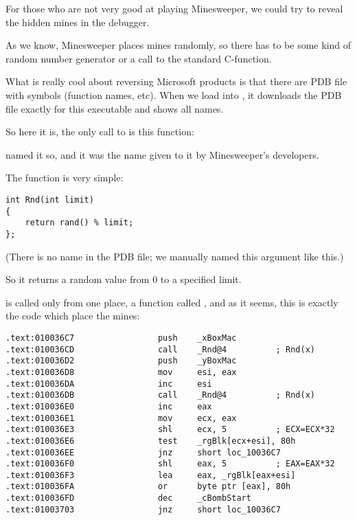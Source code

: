 \mysection{\MinesweeperWinXPExampleChapterName}
\label{minesweeper_winxp}

For those who are not very good at playing Minesweeper, we could try to reveal the hidden mines in the debugger.


As we know, Minesweeper places mines randomly, so there has to be some kind of random number generator or
a call to the standard  C-function.

What is really cool about reversing Microsoft products is that there are \gls{PDB} 
file with symbols (function names, etc).
When we load  into \IDA, it downloads the 
\gls{PDB} file exactly for this 
executable and shows all names.

So here it is, the only call to  is this function:



\IDA named it so, and it was the name given to it by Minesweeper's developers.

The function is very simple:

\begin{lstlisting}[style=customc]
int Rnd(int limit)
{
    return rand() % limit;
};
\end{lstlisting}

(There is no  name in the \gls{PDB} file; we manually named this argument like this.)

So it returns 
a random value from 0 to a specified limit.

 is called only from one place, 
a function called , 
and as it seems, this is exactly 
the code which place the mines:

\begin{lstlisting}[style=customasmx86]
.text:010036C7                 push    _xBoxMac
.text:010036CD                 call    _Rnd@4          ; Rnd(x)
.text:010036D2                 push    _yBoxMac
.text:010036D8                 mov     esi, eax
.text:010036DA                 inc     esi
.text:010036DB                 call    _Rnd@4          ; Rnd(x)
.text:010036E0                 inc     eax
.text:010036E1                 mov     ecx, eax
.text:010036E3                 shl     ecx, 5          ; ECX=ECX*32
.text:010036E6                 test    _rgBlk[ecx+esi], 80h
.text:010036EE                 jnz     short loc_10036C7
.text:010036F0                 shl     eax, 5          ; EAX=EAX*32
.text:010036F3                 lea     eax, _rgBlk[eax+esi]
.text:010036FA                 or      byte ptr [eax], 80h
.text:010036FD                 dec     _cBombStart
.text:01003703                 jnz     short loc_10036C7
\end{lstlisting}

